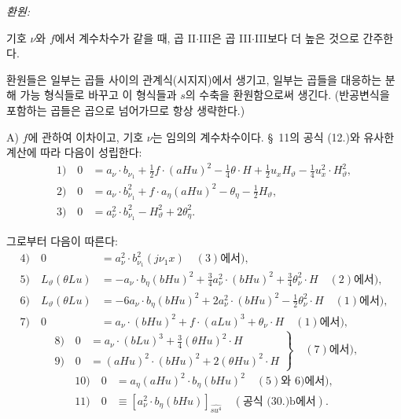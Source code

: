 \noindent\emph{환원:}

기호 $\nu$와 $f$에서 계수차수가 같을 때, 곱 II$\cdot$III은 곱 III$\cdot$III보다 더 높은 것으로 간주한다.

환원들은 일부는 곱들 사이의 관계식(시지지)에서 생기고, 일부는 곱들을 대응하는 분해 가능 형식들로 바꾸고 이 형식들과 $s$의 수축을 환원함으로써 생긴다. (반공변식을 포함하는 곱들은 곱으로 넘어가므로 항상 생략한다.)

A) $f$에 관하여 이차이고, 기호 $\nu$는 임의의 계수차수이다. \S\ 11의 공식 (12.)와 유사한 계산에 따라 다음이 성립한다:
\begin{align*}
1)\quad 0&=a_\nu\cdot b_{\nu_1}+\frac12f\cdot(aHu)^2-\frac14\theta\cdot H+\frac12u_xH_\vartheta-\frac14u_x^2\cdot H_\vartheta^2,\\
2)\quad 0&=a_\nu\cdot b_{\nu_1}^2+f\cdot a_\eta(aHu)^2-\theta_\eta-\frac12H_\vartheta,\\
3)\quad 0&=a_\nu^2\cdot b_{\nu_1}^2-H_\vartheta^2+2\theta_\eta^2.
\end{align*}

그로부터 다음이 따른다:
\begin{align*}
4)\quad 0&=a_\nu^2\cdot b_{\nu_1}^2(j\nu_1x)\quad(3)\text{에서}),\\
5)\quad L_\vartheta(\theta Lu)&=-a_\nu\cdot b_\eta(bHu)^2+\frac34a_\nu^2\cdot(bHu)^2+\frac34\theta_\nu^2\cdot H\quad(2)\text{에서}),\\
6)\quad L_\vartheta(\theta Lu)&=-6a_\nu\cdot b_\eta(bHu)^2+2a_\nu^2\cdot(bHu)^2-\frac12\theta_\nu^2\cdot H\quad(1)\text{에서}),\\
7)\quad 0&=a_\nu\cdot(bHu)^2+f\cdot(aLu)^3+\theta_\nu\cdot H\quad(1)\text{에서}),
\end{align*}
\[
\left.
\begin{aligned}
8)\quad 0&=a_\nu\cdot(bLu)^3+\frac34(\theta Hu)^2\cdot H\\
9)\quad 0&=(aHu)^2\cdot(bHu)^2+2(\theta Hu)^2\cdot H
\end{aligned}
\right\}\quad(7)\text{에서}),
\]
\begin{align*}
10)\quad 0&=a_\eta(aHu)^2\cdot b_\eta(bHu)^2\quad(5)\text{와 }6)\text{에서}),\\
11)\quad 0&\equiv [a_\nu^2\cdot b_\eta(bHu)]_{\widehat{su^4}}\quad(\text{공식 (30.)b에서}).
\end{align*}

